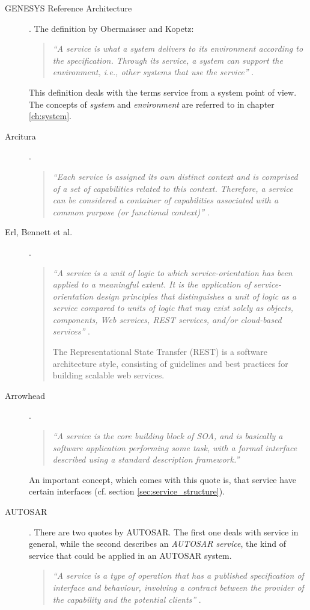 \begin{description}
\item [GENESYS Reference Architecture].
The definition by Obermaisser and Kopetz:
\begin{quote}
\emph{``A service is what a system delivers to its environment according to the specification. Through its service, a system can support the environment, i.e., other systems that use the service''} \cite[p.8]{genesys}.
\end{quote}
This definition deals with the terms service from a system point of view. The concepts of \emph{system} and \emph{environment} are referred to in chapter \ref{ch:system}. 

\item [Arcitura].
\begin{quote}
\emph{``Each service is assigned its own distinct context and is comprised of a set of capabilities related to this context. Therefore, a service can be considered a container of capabilities associated with a common purpose (or functional context)''} \cite{arcitura}.
\end{quote}

\item [Erl, Bennett et al.] . 
\begin{quote}
\emph{``A service is a unit of logic to which service-orientation has been applied to a meaningful extent. It is the application of service-orientation design principles that distinguishes a unit of logic as a service compared to units of logic that may exist solely as objects, components, Web services, REST services, and/or cloud-based services''} \cite[p.27]{erl2011}.

The Representational State Transfer (REST) is a software architecture style, consisting of guidelines and best practices for building scalable web services.
\end{quote}

\item [Arrowhead].
\begin{quote}
\emph{``A service is the core building block of SOA, and is basically a software application performing some task, with a formal interface described using a standard description framework.''} \cite{arrowhead}
\end{quote}
An important concept, which comes with this quote is, that service have certain interfaces (cf. section \ref{sec:service_structure}).

\item [AUTOSAR].
There are two quotes by AUTOSAR. The first one deals with service in general, while the second describes an \emph{AUTOSAR service}, the kind of service that could be applied in an AUTOSAR system.
\begin{quote}
\emph{``A service is a type of operation that has a published specification of interface and behaviour, involving a contract between the provider of the capability and the potential clients''} \cite{autosar_glossary}.
\end{quote}


\end{description}
